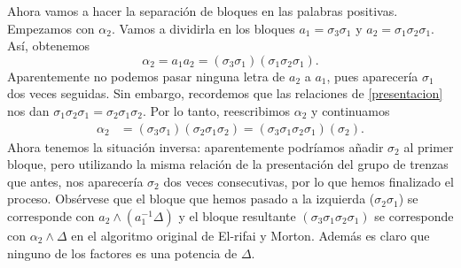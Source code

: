 \documentclass[TFG.tex]{subfiles}
\begin{document}
\begin{ej}
Ahora vamos a hacer la separación de bloques en las palabras positivas. Empezamos con $\alpha_2$. Vamos a dividirla en los bloques $a_1=\sigma_3\sigma_1$ y $a_2=\sigma_1\sigma_2\sigma_1$. Así, obtenemos
\[
\alpha_2=a_1a_2=(\sigma_3\sigma_1)(\sigma_1\sigma_2\sigma_1).
\]
Aparentemente no podemos pasar ninguna letra de $a_2$ a $a_1$, pues aparecería $\sigma_1$ dos veces seguidas. Sin embargo, recordemos que las relaciones de \ref{presentacion} nos dan $\sigma_1\sigma_2\sigma_1=\sigma_2\sigma_1\sigma_2$. Por lo tanto, reescribimos $\alpha_2$ y continuamos
\begin{align*}
\alpha_2&=(\sigma_3\sigma_1)(\sigma_2\sigma_1\sigma_2)=(\sigma_3\sigma_1\sigma_2\sigma_1)(\sigma_2).
\end{align*}
Ahora tenemos la situación inversa: aparentemente podríamos añadir $\sigma_2$ al primer bloque, pero utilizando la misma relación de la presentación del grupo de trenzas que antes, nos aparecería $\sigma_2$ dos veces consecutivas, por lo que hemos finalizado el proceso. Obsérvese que el bloque que hemos pasado a la izquierda ($\sigma_2\sigma_1$) se corresponde con $a_2\land (a_1^{-1}\Delta)$ y el bloque resultante $(\sigma_3\sigma_1\sigma_2\sigma_1)$ se corresponde con $\alpha_2\land\Delta$ en el algoritmo original de El-rifai y Morton. Además es claro que ninguno de los factores es una potencia de $\Delta$.


\end{ej}
\end{document}

